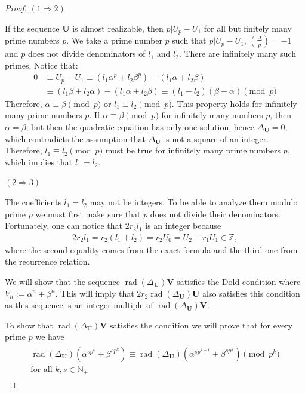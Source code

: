 \documentclass[10pt,a4paper]{amsart}
\DeclareMathOperator{\rad}{rad}
\newcommand{\N}{\mathbb{N}}
\newcommand{\Z}{\mathbb{Z}}
\begin{document}
\begin{proof}

    $(1\Rightarrow 2)$

    If the sequence ${\mathbf U}$ is almost realizable, then $p|U_p-U_1$ for all but finitely many prime numbers $p$. We take a prime number $p$ such that $p|U_p-U_1$, $\left(\frac{\Delta}{p}\right)=-1$ and $p$ does not divide denominators of $l_1$ and $l_2$. There are infinitely many such primes. Notice that:
    \begin{equation}
      \begin{split}
            0 &\equiv
            U_p - U_1 \equiv
            (l_1\alpha^p + l_2\beta^p) - (l_1\alpha + l_2\beta) \\ 
            &\equiv 
            (l_1\beta + l_2\alpha) - (l_1\alpha + l_2\beta) \equiv
            (l_1-l_2)(\beta - \alpha) \pmod p
      \end{split}
      \end{equation}
    Therefore, $\alpha \equiv \beta \pmod p$ or $l_1 \equiv l_2 \pmod p$. This property holds for infinitely many prime numbers $p$. If $\alpha \equiv \beta \pmod p$ for infinitely many numbers $p$, then  $\alpha = \beta$, but then the quadratic equation has only one solution, hence $\Delta_{\mathbf U} = 0$, which contradicts the assumption that $\Delta_{\mathbf U}$ is not a square of an integer. Therefore, $l_1 \equiv l_2 \pmod p$ must be true for infinitely many prime numbers $p$, which implies that $l_1=l_2$.

    \vskip 0.5cm
    \noindent $(2\Rightarrow3)$

    The coefficients $l_1 = l_2$ may not be integers. To be able to analyze them modulo prime $p$ we must first make sure that $p$ does not divide their denominators. Fortunately, one can notice that $2r_2l_1$ is an integer because
    \begin{align}
        2r_2l_1 = r_2(l_1+l_2) = r_2U_0 = U_2 - r_1U_1 \in \Z ,
    \end{align}
    where the second equality comes from the exact formula and the third one from the recurrence relation.

    We will show that the sequence $\rad(\Delta_\mathbf{U})\mathbf{V}$ satisfies the Dold condition where ${V}_n := \alpha^n+\beta^n$. This will imply that $2r_2\rad(\Delta_\mathbf{U})\mathbf{U}$ also satisfies this condition as this sequence is an integer multiple of $\rad(\Delta_\mathbf{U})\mathbf{V}$. 

    To show that $\rad(\Delta_\mathbf{U})\mathbf{V}$ satisfies the condition we will prove that for every prime $p$ we have
    \begin{align}\label{the_not_sq_e1}
        \begin{split}
        \rad(\Delta_\mathbf{U})\left(\alpha^{sp^k}+\beta^{sp^k}\right) \equiv 
        \rad(\Delta_\mathbf{U})\left(\alpha^{sp^{k-1}}+\beta^{sp^k}\right) 
        \pmod {p^k} 
        \\ \text{for all $k, s\in \N_+$}
        \end{split}
    \end{align}


\end{proof}
\end{document}
